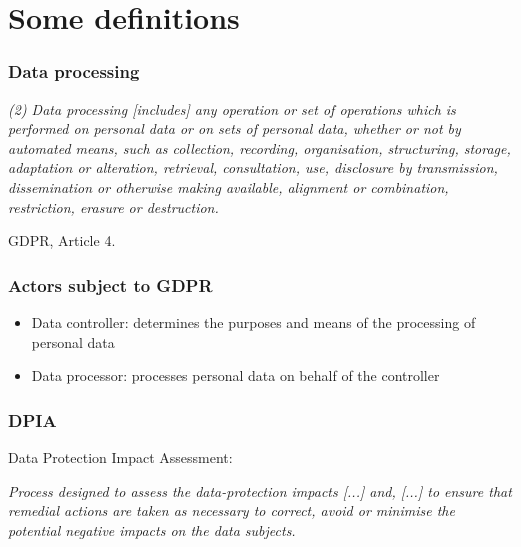 \documentclass[17pt,aspectratio=169,hyperref={pdfusetitle,colorlinks,allcolors=olive}]{beamer}
\begin{document}
\section{Some definitions}

\begin{frame}[fragile]
  \frametitle{Data processing}

  {\small
    {\em
    (2) Data processing [includes] any operation or set of operations which is performed  on  personal  data  or  on  sets  of  personal  data,  whether  or  not  by  automated  means,  such  as collection,  recording,  organisation,  structuring,  storage,  adaptation  or  alteration,  retrieval,  consultation, use,  disclosure  by  transmission,  dissemination  or  otherwise  making  available,  alignment  or  combination, restriction, erasure or destruction.
    }
  \begin{flushright}
    GDPR, Article 4.
  \end{flushright}
  }
  
\end{frame}

\begin{frame}[fragile]
  \frametitle{Actors subject to GDPR}

  \begin{itemize}
  \item Data controller: determines the purposes and means of the processing of personal data
  \item Data processor: processes personal data on behalf of the controller
  \end{itemize}
    
\end{frame}

\begin{frame}[fragile]
  \frametitle{DPIA}

  Data Protection Impact Assessment:
  \vspace{.3cm}
  
  {\em
    Process designed to   assess   the   data-protection   impacts [...]  and,   [...]  to ensure  that remedial actions are taken as necessary to correct, avoid or minimise the potential negative impacts on the data subjects.
  }
\end{frame}
\end{document}
